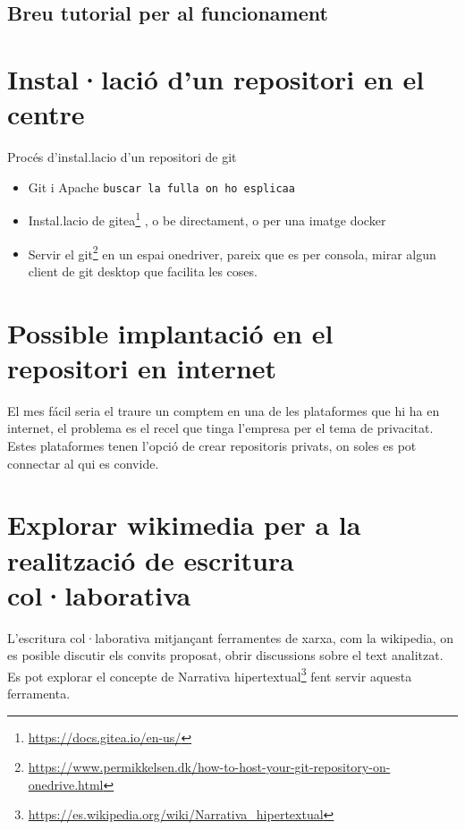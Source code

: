 \documentclass[
  10pt,
]{book}
\DeclareRobustCommand{\href}[2]{#2\footnote{\url{#1}}}
\begin{document}
\hypertarget{breu-tutorial-per-al-funcionament}{%
\subsection{Breu tutorial per al funcionament}\label{breu-tutorial-per-al-funcionament}}

\hypertarget{installaciuxf3-dun-repositori-en-el-centre}{%
\section{Instal·lació d'un repositori en el centre}\label{installaciuxf3-dun-repositori-en-el-centre}}

Procés d'instal.lacio d'un repositori de git

\begin{itemize}
\item
  Git i Apache \texttt{buscar\ la\ fulla\ on\ ho\ esplicaa}
\item
  Instal.lacio de \href{https://docs.gitea.io/en-us/}{gitea} , o be directament, o per una imatge docker
\item
  Servir el \href{https://www.permikkelsen.dk/how-to-host-your-git-repository-on-onedrive.html}{git} en un espai onedriver, pareix que es per consola, mirar algun client de git desktop que facilita les coses.
\end{itemize}

\hypertarget{possible-implantaciuxf3-en-el-repositori-en-internet}{%
\section{Possible implantació en el repositori en internet}\label{possible-implantaciuxf3-en-el-repositori-en-internet}}

El mes fácil seria el traure un comptem en una de les plataformes que hi ha en internet, el problema es el recel que tinga l'empresa per el tema de privacitat. Estes plataformes tenen l'opció de crear repositoris privats, on soles es pot connectar al qui es convide.

\hypertarget{explorar-wikimedia-per-a-la-realitzaciuxf3-de-escritura-collaborativa}{%
\section{Explorar wikimedia per a la realització de escritura col·laborativa}\label{explorar-wikimedia-per-a-la-realitzaciuxf3-de-escritura-collaborativa}}

L'escritura col·laborativa mitjançant ferramentes de xarxa, com la wikipedia, on es posible discutir els convits proposat, obrir discussions sobre el text analitzat. Es pot explorar el concepte de \href{https://es.wikipedia.org/wiki/Narrativa_hipertextual}{Narrativa hipertextual} fent servir aquesta ferramenta.
\end{document}

